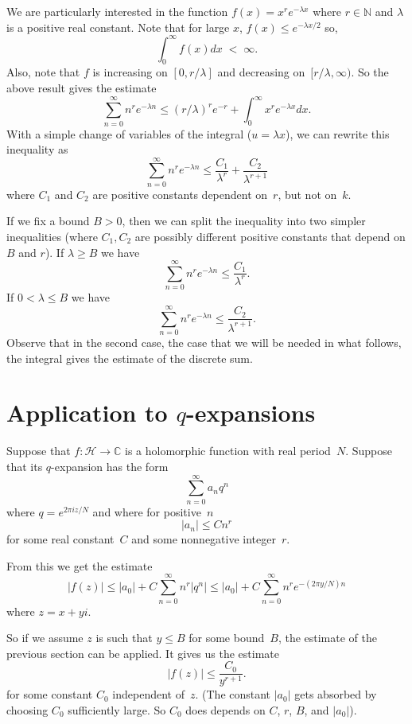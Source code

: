 \documentclass {amsart}
\theoremstyle{plain}
\theoremstyle{definition}
\theoremstyle{remark}
\newcommand{\bN}{{\mathbb{N}}}
\newcommand{\bC}{{\mathbb{C}}}
\newcommand{\h}{{\mathcal{H}}}
\begin{document}
We are particularly interested in the function $f(x) = x^r e^{-\lambda x}$ where $r \in \bN$
and $\lambda$ is a positive real constant. Note that for large $x$, $f(x) \le e^{-\lambda x / 2}$
so, 
$$
\int_{0}^\infty f(x) dx \; < \; \infty.
$$
Also, note that $f$ is increasing on $[0, r/\lambda]$ and decreasing on~$[r/\lambda, \infty)$.
So the above result gives the estimate
$$
\sum_{n=0}^\infty n^r e^{-\lambda n} \le (r/\lambda)^r e^{-r} + \int_{0}^\infty  x^r e^{-\lambda x} dx.
$$
With a simple change of variables of the integral ($u = \lambda x$), we can rewrite this
inequality as
$$
\sum_{n=0}^\infty n^r e^{-\lambda n} \le \frac{C_1}{\lambda^r} + \frac{C_2}{\lambda^{r+1}}
$$
where $C_1$ and $C_2$ are positive constants dependent on~$r$, but not on~$k$.

If we fix a bound $B >0$, then we can split the inequality into two simpler inequalities
(where $C_1, C_2$ are possibly different positive constants that depend on $B$ and $r$).
If $\lambda \ge B$ we have
$$
\sum_{n=0}^\infty n^r e^{-\lambda n} \le \frac{C_1}{\lambda^r} .
$$
If $0 < \lambda \le B$ we have 
$$
\sum_{n=0}^\infty n^r e^{-\lambda n} \le \frac{C_2}{\lambda^{r+1}}.
$$
Observe that in the second case, the case that we will be needed in what follows,
the integral gives the estimate of the discrete sum.





\section {Application to $q$-expansions}

Suppose that $f \colon \h \to \bC$ is a holomorphic function with real period~$N$.
Suppose that its $q$-expansion has the form
$$
\sum_{n=0}^\infty a_n  q^n
$$
where $q = e^{2 \pi i z  / N}$ and where for positive~$n$
$$
|a_n| \le C n^r
$$
for some real constant~$C$ and some nonnegative integer~$r$.

From this we get the estimate
$$
|f(z)| \le |a_0| + C \sum_{n=0}^\infty  n^r  \left|q^n \right| \le 
|a_0| + C \sum_{n=0}^\infty  n^r  e^{- (2 \pi y / N) n}
$$
where $z = x + y i$.

So if we assume $z$ is such that $y \le B$ for some bound~$B$, the estimate of the
previous section can be applied. It gives us the estimate
$$
|f(z)|  \le \frac{C_0}{y^{r+1}}.
$$
for some constant $C_0$ independent of~$z$.
(The constant $|a_0|$ gets absorbed by choosing $C_0$ sufficiently large.
So $C_0$ does depends on $C$, $r$, $B$, and $|a_0|$).
\end{document}
